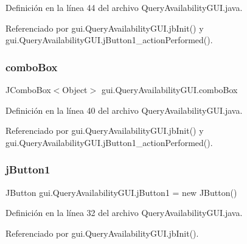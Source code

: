 Definición en la línea 44 del archivo Query\+Availability\+G\+U\+I.\+java.



Referenciado por gui.\+Query\+Availability\+G\+U\+I.\+jb\+Init() y gui.\+Query\+Availability\+G\+U\+I.\+j\+Button1\+\_\+action\+Performed().

\mbox{\label{classgui_1_1_query_availability_g_u_i_a5989d89c6130766901bc7f67969c8593}} 
\subsubsection{\texorpdfstring{comboBox}{comboBox}}
{\footnotesize\ttfamily J\+Combo\+Box$<$Object$>$ gui.\+Query\+Availability\+G\+U\+I.\+combo\+Box\hspace{0.3cm}{\ttfamily [private]}}



Definición en la línea 40 del archivo Query\+Availability\+G\+U\+I.\+java.



Referenciado por gui.\+Query\+Availability\+G\+U\+I.\+jb\+Init() y gui.\+Query\+Availability\+G\+U\+I.\+j\+Button1\+\_\+action\+Performed().

\mbox{\label{classgui_1_1_query_availability_g_u_i_a91b2e2bb1209a1c5ed740ee6d36e61d5}} 
\subsubsection{\texorpdfstring{jButton1}{jButton1}}
{\footnotesize\ttfamily J\+Button gui.\+Query\+Availability\+G\+U\+I.\+j\+Button1 = new J\+Button()\hspace{0.3cm}{\ttfamily [private]}}



Definición en la línea 32 del archivo Query\+Availability\+G\+U\+I.\+java.



Referenciado por gui.\+Query\+Availability\+G\+U\+I.\+jb\+Init().

\mbox{\label{classgui_1_1_query_availability_g_u_i_a23f23d77b23f7647d5dbbc3ced262a35}} 

